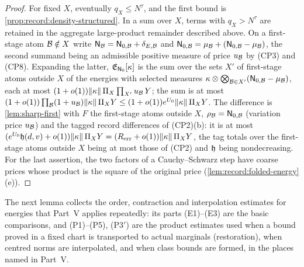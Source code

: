 \begin{proof}
For fixed $X$, eventually $q_X\le N^\tau$, and the first bound is
\cref{prop:record:density-structured}. In a sum over $X$, terms with
$q_X>N^\tau$ are retained in the aggregate large-product remainder
described above. On a first-stage atom $\mathcal B\notin X$
write $\mathsf N_\mathcal B=\mathsf N_{0,\mathcal B}+\delta_{E,\mathcal B}$ and
$\mathsf N_{0,\mathcal B}=\mu_\mathcal B+(\mathsf N_{0,\mathcal B}-\mu_\mathcal B)$, the second summand being an
admissible positive measure of price $u_\mathcal B$ by (CP3) and (CP8). Expanding
the latter, $\mathfrak E_{\mathsf N_0}[\kappa]$ is the sum over the sets $X'$ of
first-stage atoms outside $X$ of the energies with selected measures
$\kappa\otimes\bigotimes_{\mathcal B\in X'}(\mathsf N_{0,\mathcal B}-\mu_\mathcal B)$, each at most
$(1+o(1))\|\kappa\|\,\Pi_X\prod_{X'}u_\mathcal B\,Y$; the sum is at most
$(1+o(1))\prod_\mathcal B(1+u_\mathcal B)\|\kappa\|\,\Pi_XY\le(1+o(1))e^{U_0}\|\kappa\|\,\Pi_XY$.
The difference is \cref{lem:sharp-first} with $F$ the first-stage atoms
outside $X$, $\rho_\mathcal B=\mathsf N_{0,\mathcal B}$ (variation price $u_\mathcal B$) and the tagged
record differences of (CP2)(b): it is at most
$(e^{U_0}\mathfrak h(d,v)+o(1))\|\kappa\|\,\Pi_XY=(R_{\rm err}+o(1))\|\kappa\|\,
\Pi_XY$, the tag totals over the first-stage atoms outside $X$ being at most
those of (CP2) and $\mathfrak h$ being nondecreasing. For
the last assertion, the two factors of a Cauchy--Schwarz step have coarse
prices whose product is the square of the original price
(\cref{lem:record:folded-energy}(e)).
\end{proof}

The next lemma collects the order, contraction and interpolation
estimates for energies that Part~V applies repeatedly: its parts
(E1)--(E3) are the basic comparisons, and (P1)--(P5), (P3$'$) are
the product estimates used when a bound proved in a fixed chart is
transported to actual marginals (restoration), when centred norms
are interpolated, and when class bounds are formed, in the places
named in Part~V.

